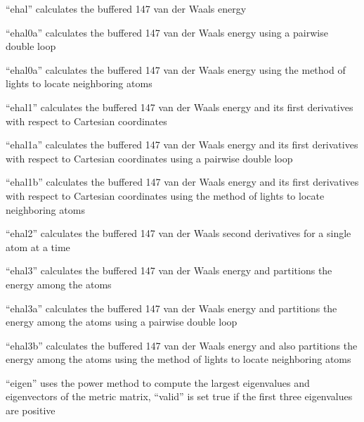 \documentclass[letterpaper,11pt,english]{sphinxmanual}
\begin{document}
“ehal” calculates the buffered 14\sphinxhyphen{}7 van der Waals energy


“ehal0a” calculates the buffered 14\sphinxhyphen{}7 van der Waals energy using a pairwise double loop


“ehal0a” calculates the buffered 14\sphinxhyphen{}7 van der Waals energy using the method of lights to locate neighboring atoms


“ehal1” calculates the buffered 14\sphinxhyphen{}7 van der Waals energy and its first derivatives with respect to Cartesian coordinates


“ehal1a” calculates the buffered 14\sphinxhyphen{}7 van der Waals energy and its first derivatives with respect to Cartesian coordinates using a pairwise double loop


“ehal1b” calculates the buffered 14\sphinxhyphen{}7 van der Waals energy and its first derivatives with respect to Cartesian coordinates using the method of lights to locate neighboring atoms


“ehal2” calculates the buffered 14\sphinxhyphen{}7 van der Waals second derivatives for a single atom at a time


“ehal3” calculates the buffered 14\sphinxhyphen{}7 van der Waals energy and partitions the energy among the atoms


“ehal3a” calculates the buffered 14\sphinxhyphen{}7 van der Waals energy and partitions the energy among the atoms using a pairwise double loop


“ehal3b” calculates the buffered 14\sphinxhyphen{}7 van der Waals energy and also partitions the energy among the atoms using the method of lights to locate neighboring atoms


“eigen” uses the power method to compute the largest eigenvalues and eigenvectors of the metric matrix, “valid” is set true if the first three eigenvalues are positive
\end{document}
